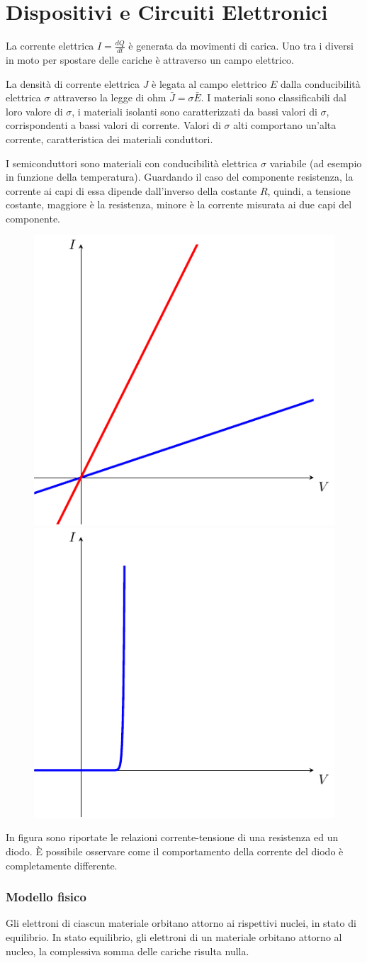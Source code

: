 \documentclass[../template]{subfiles}
\newcommand{\idiff}{\ensuremath{I = \frac{dQ}{dt}}}
\begin{document}
\section{Dispositivi e Circuiti Elettronici}
La corrente elettrica $\idiff$ è generata da movimenti di carica. Uno tra i diversi in moto per spostare delle cariche è attraverso un campo elettrico.

La densità di corrente elettrica $J$ è legata al campo elettrico $E$ dalla conducibilità elettrica $\sigma$ attraverso la legge di ohm $\bar{J} = \sigma \bar{E}$.
I materiali sono classificabili dal loro valore di $\sigma$, i materiali isolanti sono caratterizzati da bassi valori di $\sigma$, corrispondenti a bassi valori di corrente.
Valori di $\sigma$ alti comportano un'alta corrente, caratteristica dei materiali conduttori.

I semiconduttori sono materiali con conducibilità elettrica $\sigma$ variabile (ad esempio in funzione della temperatura).
Guardando il caso del componente resistenza, la corrente ai capi di essa dipende dall'inverso della costante $R$, quindi, a tensione costante, maggiore è la resistenza, minore è la corrente misurata ai due capi del componente.

\begin{figure}[h]
    \centering
    \includegraphics[width=.30\textwidth]{img/resistence-current}
    \includegraphics[width=.30\textwidth]{img/diode-current-graph}
\end{figure}
In figura sono riportate le relazioni corrente-tensione di una resistenza ed un diodo. È possibile osservare come il comportamento della corrente del diodo è completamente differente.

\subsubsection{Modello fisico}
Gli elettroni di ciascun materiale orbitano attorno ai rispettivi nuclei, in stato di equilibrio.
In stato equilibrio, gli elettroni di un materiale orbitano attorno al nucleo, la complessiva somma delle cariche risulta nulla.
\end{document}
